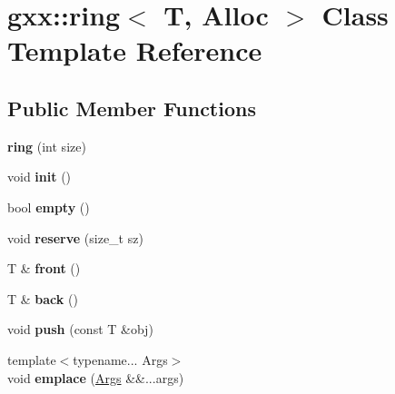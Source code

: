 \hypertarget{classgxx_1_1ring}{}\section{gxx\+:\+:ring$<$ T, Alloc $>$ Class Template Reference}
\label{classgxx_1_1ring}
\subsection*{Public Member Functions}
\begin{DoxyCompactItemize}
\item 
{\bfseries ring} (int size)\hypertarget{classgxx_1_1ring_acf8cd6f22055ccfb5f5eb201f4c7e585}{}\label{classgxx_1_1ring_acf8cd6f22055ccfb5f5eb201f4c7e585}

\item 
void {\bfseries init} ()\hypertarget{classgxx_1_1ring_a389c63d73f1ab2a13cdb920798038071}{}\label{classgxx_1_1ring_a389c63d73f1ab2a13cdb920798038071}

\item 
bool {\bfseries empty} ()\hypertarget{classgxx_1_1ring_a824768a98ac4280ee66b175538197745}{}\label{classgxx_1_1ring_a824768a98ac4280ee66b175538197745}

\item 
void {\bfseries reserve} (size\+\_\+t sz)\hypertarget{classgxx_1_1ring_a8d9dccaf117a20e3ab72ef768b404deb}{}\label{classgxx_1_1ring_a8d9dccaf117a20e3ab72ef768b404deb}

\item 
T \& {\bfseries front} ()\hypertarget{classgxx_1_1ring_ad71960bddf20bcca5b54b0e3d8cdb29a}{}\label{classgxx_1_1ring_ad71960bddf20bcca5b54b0e3d8cdb29a}

\item 
T \& {\bfseries back} ()\hypertarget{classgxx_1_1ring_a140be740679b3d888edf6704a3edb06e}{}\label{classgxx_1_1ring_a140be740679b3d888edf6704a3edb06e}

\item 
void {\bfseries push} (const T \&obj)\hypertarget{classgxx_1_1ring_ac42bce4de51f56dc8f120fcb360b5a2a}{}\label{classgxx_1_1ring_ac42bce4de51f56dc8f120fcb360b5a2a}

\item 
{\footnotesize template$<$typename... Args$>$ }\\void {\bfseries emplace} (\hyperlink{structArgs}{Args} \&\&...args)\hypertarget{classgxx_1_1ring_aafb5d3621448de24a0aadb4f551a6f59}{}\label{classgxx_1_1ring_aafb5d3621448de24a0aadb4f551a6f59}


\end{DoxyCompactItemize}
